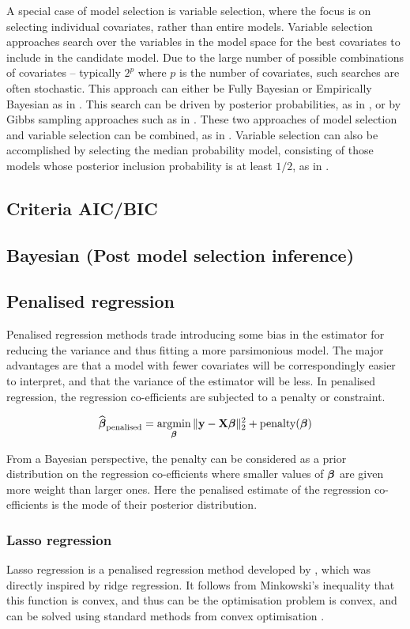 A special case of model selection is variable selection, where the focus is on selecting individual
covariates, rather than entire models. Variable selection approaches search over the
variables in the model space for the best covariates to include in the candidate model. Due to the large
number of possible combinations of covariates -- typically $2^p$ where $p$ is the number of covariates, such
searches are often stochastic. This approach can either be Fully Bayesian or Empirically Bayesian as in
\citep{Cui2008}.  This search can be driven by posterior probabilities, as in \citep{Casella2006}, or by Gibbs
sampling approaches such as in \citep{George1993}. These two approaches of model selection and variable
selection can be combined, as in \citep{Geweke1996}. Variable selection can also be accomplished by selecting
the median probability model, consisting of those models whose posterior inclusion probability is at least
$1/2$, as in \citep{Barbieri2004}.

\subsection{Criteria AIC/BIC}
\subsection{Bayesian (Post model selection inference)}

\subsection{Penalised regression}
Penalised regression methods trade introducing some bias in the estimator for reducing the variance and thus
fitting a more parsimonious model. The major advantages are that a model with fewer covariates will be
correspondingly easier to interpret, and that the variance of the estimator will be less. In penalised
regression, the regression co-efficients are subjected to a penalty or constraint.

$$
\widehat{\vbeta}_{\text{penalised}} = \argmin_\vbeta \|\vy - \mX \vbeta\|_2^2 + \text{penalty}(\vbeta)
$$

From a Bayesian perspective, the penalty can be considered as a prior distribution on the regression 
co-efficients where smaller values of ${\boldsymbol \beta}$ are given more weight than larger ones. Here the penalised
estimate of the regression co-efficients is the mode of their posterior distribution.

\subsubsection{Lasso regression}
Lasso regression is a penalised regression method developed by \citep{Tibshirani1996}, which was directly
inspired by ridge regression.
It follows from Minkowski's inequality that this function is convex, and thus can be the optimisation problem
is convex, and can be solved using standard methods from convex optimisation \citep{Boyd2010}.

